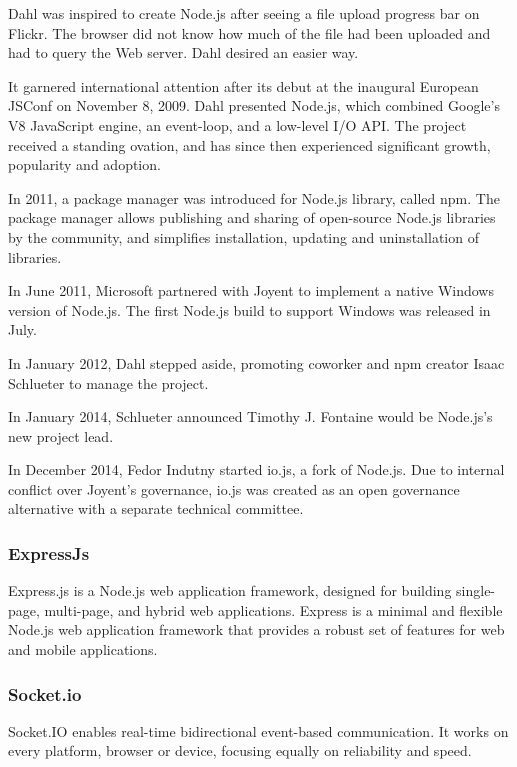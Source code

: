 Dahl was inspired to create Node.js after seeing a file upload progress bar on Flickr. The browser did not know how much of the file had been uploaded and had to query the Web server. Dahl desired an easier way.

It garnered international attention after its debut at the inaugural European JSConf on November 8, 2009. Dahl presented Node.js, which combined Google's V8 JavaScript engine, an event-loop, and a low-level I/O API. The project received a standing ovation, and has since then experienced significant growth, popularity and adoption.

In 2011, a package manager was introduced for Node.js library, called npm. The package manager allows publishing and sharing of open-source Node.js libraries by the community, and simplifies installation, updating and uninstallation of libraries.

In June 2011, Microsoft partnered with Joyent to implement a native Windows version of Node.js. The first Node.js build to support Windows was released in July.

In January 2012, Dahl stepped aside, promoting coworker and npm creator Isaac Schlueter to manage the project.

In January 2014, Schlueter announced Timothy J. Fontaine would be Node.js's new project lead.

In December 2014, Fedor Indutny started io.js, a fork of Node.js. Due to internal conflict over Joyent's governance, io.js was created as an open governance alternative with a separate technical committee.

\subsubsection{ExpressJs}
Express.js is a Node.js web application framework, designed for building single-page, multi-page, and hybrid web applications.
Express is a minimal and flexible Node.js web application framework that provides a robust set of features for web and mobile applications.
\subsubsection{Socket.io}
Socket.IO enables real-time bidirectional event-based communication.
It works on every platform, browser or device, focusing equally on reliability and speed.
